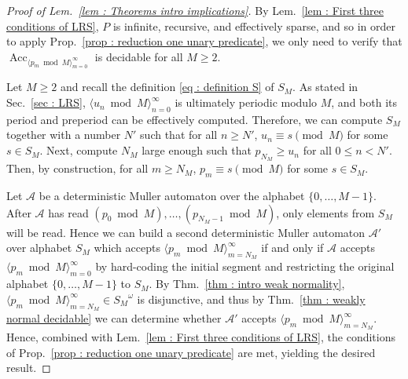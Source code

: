 \documentclass[a4paper,UKenglish,cleveref, autoref, thm-restate]{lipics-v2021}
\newcommand{\Acc} {\operatorname{Acc}}
\begin{document}
\begin{proof}[Proof of Lem.~\ref{lem : Theorems intro implications}]
   By Lem.~\ref{lem : First three conditions of LRS}, $P$ is infinite,
   recursive, and effectively sparse, and so in order to apply Prop.~\ref{prop
     : reduction one unary predicate}, we only need to verify that
   $\Acc_{\langle p_m\bmod M\rangle_{m=0}^\infty}$ is decidable for all $M \ge 2$. 
    
    Let $M \ge 2$ and recall the definition \eqref{eq : definition S} of $S_M$.
    As stated in Sec.~\ref{sec : LRS}, $\langle u_n\bmod M\rangle_{n=0}^\infty$ is ultimately periodic modulo $M$, and both its period and preperiod can be effectively computed.
    Therefore, we can compute $S_M$ together with a number $N'$ such that for all $n \ge N'$, $u_n \equiv s \pmod M$ for some $s \in S_M$. 
    Next, compute $N_M$ large enough such that $p_{N_M} \ge u_n$ for all $0 \le n < N'$. 
    Then, by construction, for all $m \ge N_M$, $p_m \equiv s \pmod M$ for some $s \in S_M$. 

    Let $\mathcal{A}$ be a deterministic Muller automaton over the alphabet $\{0,\dots,M-1\}$. 
    After $\mathcal{A}$ has read $(p_0\bmod M),\dots,(p_{N_M-1}\bmod M)$, only elements from $S_M$ will be read.  
    Hence we can build a second deterministic Muller automaton $\mathcal{A}'$ over alphabet $S_M$ which accepts $\langle p_m\bmod M\rangle_{m=N_M}^\infty$ if and only if $\mathcal{A}$ accepts $\langle p_m\bmod M\rangle_{m=0}^\infty$ by hard-coding the initial segment and restricting the original alphabet $\{0,\dots,M-1\}$ to $S_M$.  
    By Thm.~\ref{thm : intro weak normality}, $\langle p_m\bmod M\rangle_{m=N_M}^\infty \in {S_M}^\omega$ is disjunctive, and thus by Thm.~\ref{thm : weakly normal decidable} we can determine whether $\mathcal{A}'$ accepts $\langle p_m\bmod M\rangle_{m=N_M}^\infty$. 
    Hence, combined with Lem.~\ref{lem : First three conditions of LRS}, the conditions of Prop.~\ref{prop : reduction one unary predicate} are met, yielding the desired result.
\end{proof}
\end{document}
